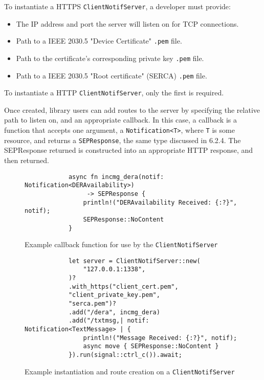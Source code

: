 To instantiate a HTTPS \texttt{ClientNotifServer}, a developer must provide:

\begin{itemize}
    \item The IP address and port the server will listen on for TCP connections.
    \item Path to a IEEE 2030.5 "Device Certificate" \texttt{.pem} file.
    \item Path to the certificate's corresponding private key \texttt{.pem} file.
    \item Path to a IEEE 2030.5 "Root certificate" (SERCA) \texttt{.pem} file. 
\end{itemize}

To instantiate a HTTP \texttt{ClientNotifServer}, only the first is required.

Once created, library users can add routes to the server by specifying the relative path to listen on, and an appropriate callback. In this case, a callback is a function that accepts one argument, a \texttt{Notification<T>}, where \texttt{T} is some resource, and returns a \texttt{SEPResponse}, the same type discussed in 6.2.4. The SEPResponse returned is constructed into an appropriate HTTP response, and then returned.

\begin{figure}[h]
    \begin{center}
        \begin{lstlisting}
            async fn incmg_dera(notif: Notification<DERAvailability>)
                 -> SEPResponse {
                println!("DERAvailability Received: {:?}", notif);
                SEPResponse::NoContent
            }
        \end{lstlisting}
        \label{fig:notiffn}
        \vspace{-10pt}
        \caption{Example callback function for use by the \texttt{ClientNotifServer}}
    \end{center}
\end{figure}

\begin{figure}[h]
    \begin{center}
        \begin{lstlisting}
            let server = ClientNotifServer::new(
                "127.0.0.1:1338",
            )?
            .with_https("client_cert.pem",
            "client_private_key.pem",
            "serca.pem")?
            .add("/dera", incmg_dera)
            .add("/txtmsg,| notif: Notification<TextMessage> | {
                println!("Message Received: {:?}", notif);
                async move { SEPResponse::NoContent }
            }).run(signal::ctrl_c()).await;
        \end{lstlisting}
        \label{fig:notifroutes}
        \vspace{-10pt}
        \caption{Example instantiation and route creation on a \texttt{ClientNotifServer}}
    \end{center}
\end{figure}

